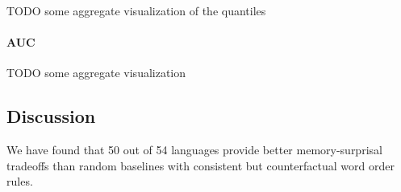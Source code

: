 TODO some aggregate visualization of the quantiles

\paragraph{AUC}

TODO some aggregate visualization





















\subsection{Discussion}

We have found that 50 out of 54 languages provide better memory-surprisal tradeoffs than random baselines with consistent but counterfactual word order rules.

